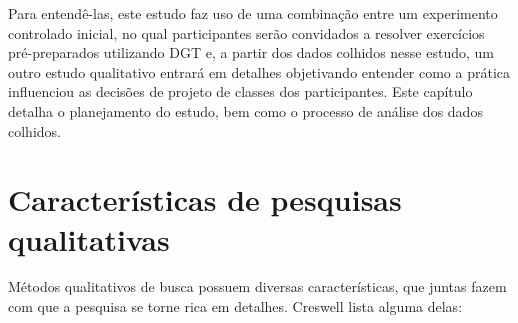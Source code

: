 Para entendê-las, este estudo faz uso de uma combinação entre um experimento controlado inicial, no qual participantes serão
convidados a resolver exercícios pré-preparados utilizando DGT e, a partir dos dados colhidos nesse estudo, um outro
estudo qualitativo entrará em detalhes objetivando entender como a prática influenciou as decisões de projeto de classes dos participantes.
Este capítulo detalha o planejamento do estudo, bem como o processo de análise dos dados colhidos.


\section{Características de pesquisas qualitativas}

Métodos qualitativos de busca possuem diversas características, que juntas fazem
com que a pesquisa se torne rica em detalhes. Creswell \cite{creswell} lista
alguma delas:

